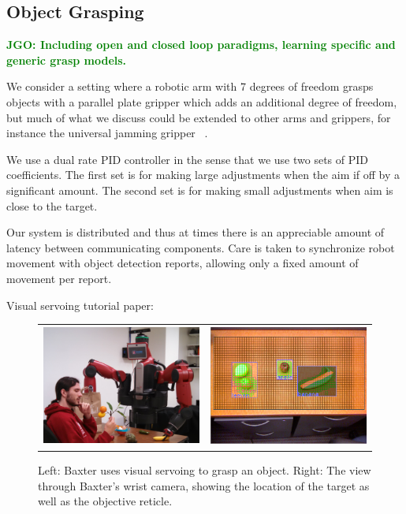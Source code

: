 \documentclass[conference]{IEEEtran}
\newcommand{\jgonote}[1]{\textcolor{Green}{\textbf{JGO: #1}}}
\begin{document}
\subsection{Object Grasping}
\jgonote{Including open and closed loop paradigms, learning specific and generic grasp models.}

We consider a setting where a robotic arm
with 7 degrees of freedom grasps objects with a parallel plate gripper which adds
an additional degree of freedom, but much of what we discuss could be extended to other
arms and grippers, for instance the universal jamming gripper ~\citep{}.

We use a dual rate PID controller in the sense that we use two sets of PID coefficients. The
first set is for making large adjustments when the aim if off by a significant amount. The
second set is for making small adjustments when aim is close to the target.

Our system is distributed and thus at times there is an appreciable amount of latency between
communicating components. Care is taken to synchronize robot movement with object detection
reports, allowing only a fixed amount of movement per report.

Visual servoing tutorial paper: \citep{chaumette06}

\begin{figure}
  \begin{center}
    \begin{tabular}{l c}
      \includegraphics[width=200px, height=150px]{robo2.png} &
      \includegraphics[width=200px, height=150px]{screen2.png} \\
    \end{tabular}
  \end{center}
  \caption{Left: Baxter uses visual servoing to grasp an object. Right: The view through Baxter's wrist camera, 
    showing the location of the target as well as the objective reticle.}
\end{figure}
\end{document}
